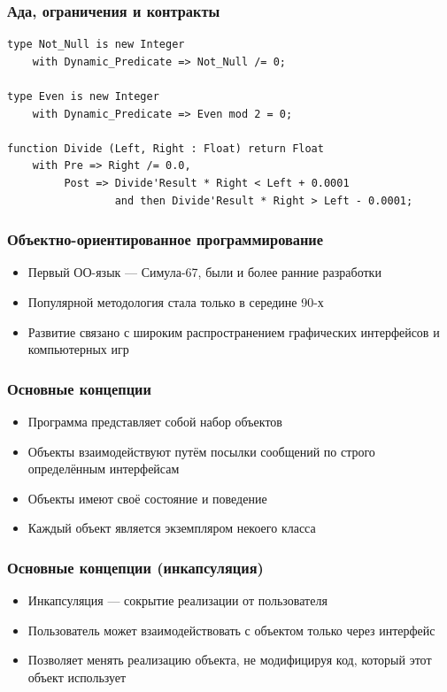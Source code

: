 \documentclass[xetex,mathserif,serif]{beamer}
\begin{document}
	\begin{frame}[fragile]
		\frametitle{Ада, ограничения и контракты}
		\begin{verbatim}
type Not_Null is new Integer
    with Dynamic_Predicate => Not_Null /= 0;

type Even is new Integer
    with Dynamic_Predicate => Even mod 2 = 0;

function Divide (Left, Right : Float) return Float
    with Pre => Right /= 0.0,
         Post => Divide'Result * Right < Left + 0.0001
                 and then Divide'Result * Right > Left - 0.0001;
		\end{verbatim}
	\end{frame}

	\begin{frame}
		\frametitle{Объектно-ориентированное программирование}
		\begin{itemize}
			\item Первый ОО-язык --- Симула-67, были и более ранние разработки
			\item Популярной методология стала только в середине 90-х
			\item Развитие связано с широким распространением графических интерфейсов и компьютерных игр
		\end{itemize}
	\end{frame}

	\begin{frame}
		\frametitle{Основные концепции}
		\begin{itemize}
			\item Программа представляет собой набор объектов
			\item Объекты взаимодействуют путём посылки сообщений по строго определённым интерфейсам
			\item Объекты имеют своё состояние и поведение
			\item Каждый объект является экземпляром некоего класса
		\end{itemize}
	\end{frame}

	\begin{frame}
		\frametitle{Основные концепции (инкапсуляция)}
		\begin{itemize}
			\item Инкапсуляция --- сокрытие реализации от пользователя
			\item Пользователь может взаимодействовать с объектом только через интерфейс
			\item Позволяет менять реализацию объекта, не модифицируя код, который этот объект использует
		\end{itemize}
	\end{frame}
\end{document}
